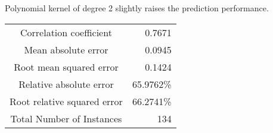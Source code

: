 Polynomial kernel of degree 2 slightly raises the prediction performance.

\begin{tabular}{ c r }
Correlation coefficient        &          0.7671 \\
Mean absolute error            &          0.0945 \\
Root mean squared error        &          0.1424 \\
Relative absolute error        &         65.9762\% \\
Root relative squared error    &         66.2741\% \\
Total Number of Instances      &        134 \\
\end{tabular}

